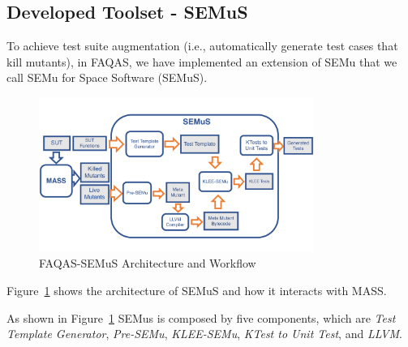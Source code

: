 
\newpage
\subsection{Developed Toolset - SEMuS}
\label{sec:semus}

\STARTCHANGEDWPT


To achieve test suite augmentation (i.e., automatically generate test cases that kill mutants), in FAQAS, we have implemented an extension of SEMu that we call SEMu for Space Software (SEMuS).



\begin{figure}[tb]
\begin{center}
\includegraphics[width=0.8\textwidth]{images/semus-architecture}
\caption{FAQAS-SEMuS Architecture and Workflow}
\label{fig:semus_architecture}
\end{center}
\end{figure}

Figure~\ref{fig:semus_architecture} shows the architecture of SEMuS and how it interacts with MASS.


As shown in Figure~\ref{fig:semus_architecture} SEMus is composed by five components, which are \emph{Test Template Generator},  \emph{Pre-SEMu},  \emph{KLEE-SEMu},  \emph{KTest to Unit Test}, and \emph{LLVM}.

